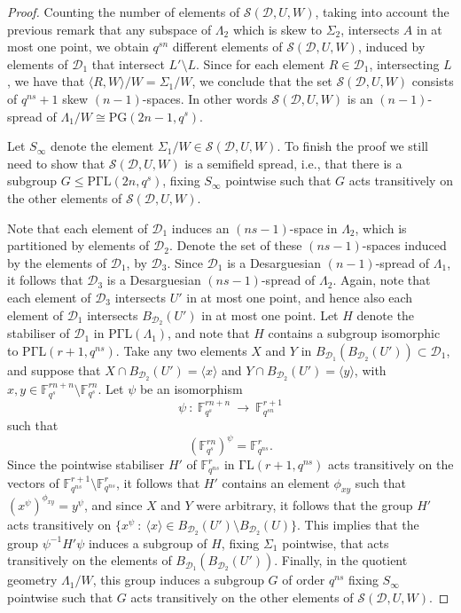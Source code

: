 \documentclass[12pt]{amsart}
\def\F{\mathbb{F}}
\def\PG{\mathrm{PG}}
\def\D{\mathcal{D}}
\begin{document}
\begin{proof}
Counting the number of elements of ${\mathcal{S}}(\D,U,W)$, taking into account the previous remark that any subspace of $\Lambda_2$ which is skew to $\Sigma_2$, intersects $A$ in at most one point, we obtain $q^{sn}$ different elements of ${\mathcal{S}}(\D,U,W)$, induced by elements of $\D_1$ that intersect $L'\setminus L$. Since for each element $R\in \D_1$, intersecting $L$, we have that
$\langle R,W\rangle /W = \Sigma_1/W$, we conclude that the set ${\mathcal{S}}(\D,U,W)$ consists of $q^{ns}+1$ skew $(n-1)$-spaces. In other words ${\mathcal{S}}(\D,U,W)$ is an $(n-1)$-spread of
$\Lambda_1 /W \cong \PG(2n-1,q^s)$.

Let $S_\infty$ denote the element $\Sigma_1/W\in {\mathcal{S}}(\D,U,W)$. To finish the proof we still need to show that  ${\mathcal{S}}(\D,U,W)$ is a semifield spread, i.e., 
that there is a subgroup $G\leq {\mathrm{P\Gamma L}}(2n,q^s)$, fixing $S_\infty$ pointwise such that $G$ acts transitively on the other elements of ${\mathcal{S}}(\D,U,W)$.

Note that each element of $\D_1$ induces an $(ns-1)$-space in $\Lambda_2$, which is partitioned by elements of $\D_2$. Denote the set of these $(ns-1)$-spaces induced by the elements of $\D_1$, by $\D_3$. Since $\D_1$ is a Desarguesian $(n-1)$-spread of $\Lambda_1$, it follows that $\D_3$ is a Desarguesian $(ns-1)$-spread of $\Lambda_2$. Again, note that each element of $\D_3$ intersects $U'$ in at most one point, and hence also each element of $\D_1$ intersects $B_{\D_2}(U')$ in at most one point. Let $H$ denote the stabiliser of $\D_1$ in ${\mathrm{P\Gamma L}}(\Lambda_1)$, and note that $H$ contains a subgroup isomorphic to ${\mathrm{P\Gamma L}}(r+1,q^{ns})$. Take any two elements $X$ and $Y$ in $B_{\D_1}(B_{\D_2}(U'))\subset \D_1$, and suppose that $X\cap B_{\D_2}(U')=\langle x\rangle$ and $Y\cap B_{\D_2}(U')=\langle y\rangle$, with $x,y\in \F_{q^s}^{rn+n}\setminus \F_{q^s}^{rn}$. Let $\psi$ be an isomorphism
$$\psi~:~ \F_{q^s}^{rn+n} ~\rightarrow ~\F_{q^{sn}}^{r+1}$$ 
such that 
$$(\F_{q^s}^{rn})^\psi =\F_{q^{ns}}^{r}.$$
Since the pointwise stabiliser $H'$ of $\F_{q^{ns}}^r$ in ${\mathrm{\Gamma L}}(r+1,q^{ns})$ acts transitively on the vectors of $\F_{q^{ns}}^{r+1}\setminus \F_{q^{ns}}^{r}$, it follows that $H'$ contains an element $\phi_{xy}$ such that $(x^\psi)^{\phi_{xy}}=y^\psi$, and since $X$ and $Y$ were arbitrary, it follows that the group $H'$ acts transitively on $\{x^\psi ~:~ \langle x \rangle \in B_{\D_2}(U')\setminus B_{\D_2}(U)\}$. 
This implies that the group $\psi^{-1}H'\psi$ induces a subgroup of $H$, fixing $\Sigma_1$ pointwise, that acts transitively on the elements of $B_{\D_1}(B_{\D_2}(U'))$. Finally, in the quotient geometry $\Lambda_1/W$, this group induces a subgroup $G$ of order $q^{ns}$ fixing $S_\infty$ pointwise such that $G$ acts transitively on the other elements of ${\mathcal{S}}(\D,U,W)$.
\end{proof}
\end{document}

